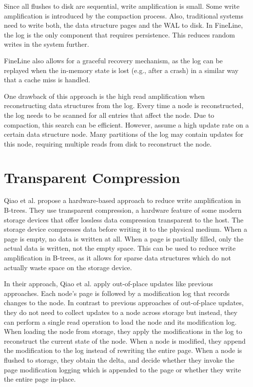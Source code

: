 Since all flushes to disk are sequential, write amplification is small.
Some write amplification is introduced by the compaction process.
Also, traditional systems need to write both, the data structure pages and the \ac{WAL} to disk.
In FineLine, the log is the only component that requires persistence.
This reduces random writes in the system further.

FineLine also allows for a graceful recovery mechanism, as the log can be replayed when the in-memory state is lost (e.g., after a crash) in a similar way that a cache miss is handled.

One drawback of this approach is the high read amplification when reconstructing data structures from the log.
Every time a node is reconstructed, the log needs to be scanned for all entries that affect the node.
Due to compaction, this search can be efficient.
However, assume a high update rate on a certain data structure node.
Many partitions of the log may contain updates for this node, requiring multiple reads from disk to reconstruct the node.


\section{Transparent Compression}
Qiao et al. \cite{qiao2022compression} propose a hardware-based approach to reduce write amplification in B-trees.
They use transparent compression, a hardware feature of some modern storage devices that offer lossless data compression transparent to the host.
The storage device compresses data before writing it to the physical medium.
When a page is empty, no data is written at all.
When a page is partially filled, only the actual data is written, not the empty space.
This can be used to reduce write amplification in B-trees, as it allows for sparse data structures which do not actually waste space on the storage device.

In their approach, Qiao et al. apply out-of-place updates like previous approaches.
Each node's page is followed by a modification log that records changes to the node.
In contrast to previous approaches of out-of-place updates, they do not need to collect updates to a node across storage but instead, they can perform a single read operation to load the node and its modification log.
When loading the node from storage, they apply the modifications in the log to reconstruct the current state of the node.
When a node is modified, they append the modification to the log instead of rewriting the entire page.
When a node is flushed to storage, they obtain the delta, and decide whether they invoke the page modification logging which is appended to the page or whether they write the entire page in-place.

